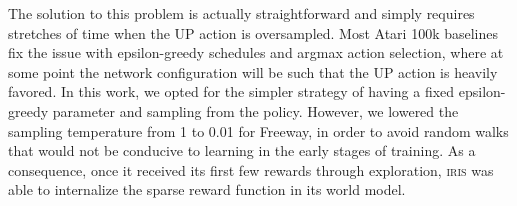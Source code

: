 

The solution to this problem is actually straightforward and simply requires stretches of time when the UP action is oversampled. Most Atari 100k baselines fix the issue with epsilon-greedy schedules and argmax action selection, where at some point the network configuration will be such that the UP action is heavily favored. In this work, we opted for the simpler strategy of having a fixed epsilon-greedy parameter and sampling from the policy. However, we lowered the sampling temperature from 1 to 0.01 for Freeway, in order to avoid random walks that would not be conducive to learning in the early stages of training. As a consequence, once it received its first few rewards through exploration, \textsc{iris} was able to internalize the sparse reward function in its world model.

\newpage 

